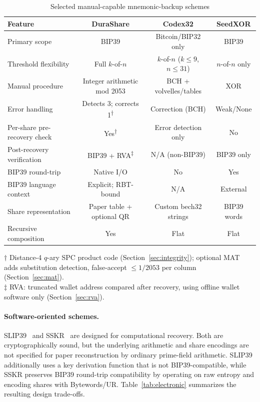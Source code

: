 \documentclass[11pt]{article}
\begin{document}
\begin{table}[H]
\centering
\caption{Selected manual-capable mnemonic-backup schemes}
\label{tab:manual}
\small
\begin{tabular}{@{}lccc@{}}
\toprule
\textbf{Feature} & \textbf{DuraShare} & \textbf{Codex32} & \textbf{SeedXOR} \\ \midrule
Primary scope & BIP39 & Bitcoin/BIP32 only & BIP39 \\
Threshold flexibility & Full $k$-of-$n$ & $k$-of-$n$ ($k \leq 9$, $n \leq 31$) & $n$-of-$n$ only \\
Manual procedure & Integer arithmetic mod 2053 & BCH + volvelles/tables & XOR \\
Error handling & Detects 3; corrects 1\textsuperscript{$\dagger$} & Correction (BCH) & Weak/None \\
Per-share pre-recovery check & Yes\textsuperscript{$\dagger$} & Error detection only & No \\
Post-recovery verification & BIP39 + RVA\textsuperscript{$\ddagger$} & N/A (non-BIP39) & BIP39 only \\
BIP39 round-trip & Native I/O & No & Yes \\
BIP39 language context & Explicit; RBT-bound & N/A & External \\
Share representation & Paper table + optional QR & Custom bech32 strings & BIP39 words \\
Recursive composition & Yes & Flat & Flat \\
\bottomrule
\end{tabular}

\medskip
\footnotesize
$\dagger$ Distance-4 $q$-ary SPC product code (Section~\ref{sec:integrity}); optional MAT adds substitution detection, false-accept $\leq 1/2053$ per column (Section~\ref{sec:mat}).\\
$\ddagger$ RVA: truncated wallet address compared after recovery, using offline wallet software only (Section~\ref{sec:rva}).
\end{table}

\paragraph{Software-oriented schemes.} SLIP39~\cite{slip39} and SSKR~\cite{sskr} are designed for computational recovery. Both are cryptographically sound, but the underlying arithmetic and share encodings are not specified for paper reconstruction by ordinary prime-field arithmetic. SLIP39 additionally uses a key derivation function that is not BIP39-compatible, while SSKR preserves BIP39 round-trip compatibility by operating on raw entropy and encoding shares with Bytewords/UR. Table~\ref{tab:electronic} summarizes the resulting design trade-offs.
\end{document}
